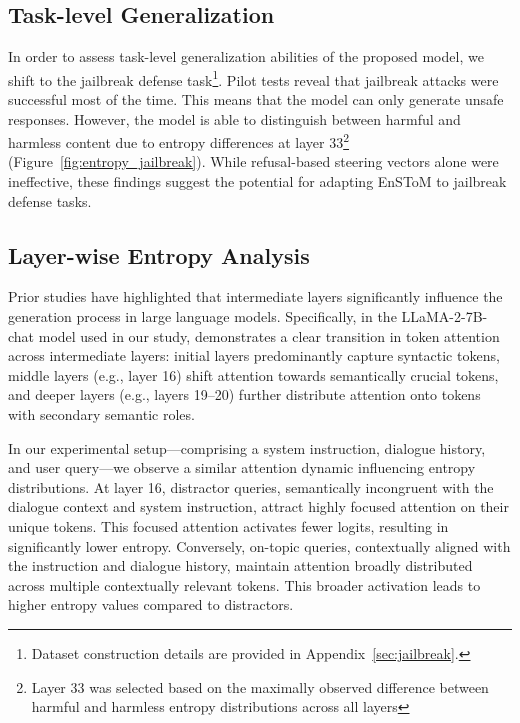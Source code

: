 \documentclass[11pt]{article}
\begin{document}
\subsection{Task-level Generalization}
In order to assess task-level generalization abilities of the proposed model, we shift to the jailbreak defense task\footnote{Dataset construction details are provided in Appendix~\ref{sec:jailbreak}.}. Pilot tests reveal that jailbreak attacks were successful most of the time. This means that the model can only generate unsafe responses. However, the model is able to distinguish between harmful and harmless content due to entropy differences at layer 33\footnote{Layer 33 was selected based on the maximally observed difference between harmful and harmless entropy distributions across all layers} (Figure~\ref{fig:entropy_jailbreak}). While refusal-based steering vectors alone were ineffective, these findings suggest the potential for adapting EnSToM to jailbreak defense tasks. 

\subsection{Layer-wise Entropy Analysis}\label{sec:analysis}

Prior studies \cite{li2025safety,azaria-mitchell-2023-internal,chuang2024dola} have highlighted that intermediate layers significantly influence the generation process in large language models. Specifically, in the LLaMA-2-7B-chat model used in our study, \citet{li2025safety} demonstrates a clear transition in token attention across intermediate layers: initial layers predominantly capture syntactic tokens, middle layers (e.g., layer 16) shift attention towards semantically crucial tokens, and deeper layers (e.g., layers 19–20) further distribute attention onto tokens with secondary semantic roles.

In our experimental setup—comprising a system instruction, dialogue history, and user query—we observe a similar attention dynamic influencing entropy distributions. At layer 16, distractor queries, semantically incongruent with the dialogue context and system instruction, attract highly focused attention on their unique tokens. This focused attention activates fewer logits, resulting in significantly lower entropy. Conversely, on-topic queries, contextually aligned with the instruction and dialogue history, maintain attention broadly distributed across multiple contextually relevant tokens. This broader activation leads to higher entropy values compared to distractors.
\end{document}
